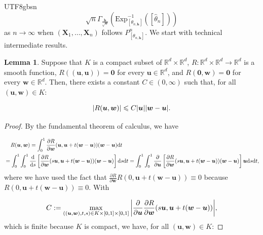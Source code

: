 \documentclass[12pt]{report}
\newcommand\tab[1][1cm]{\hspace*{#1}}
\newcommand{\bracket}[1]{\left ( #1 \right )}
\newcommand{\squared}[1]{\left [ #1 \right ]}
\theoremstyle{plain}
\theoremstyle{definition}
\newtheorem{lemma}[theorem]{Lemma}
\begin{document}
\begin{CJK*}{UTF8}{gbsn}
\begin{equation*}
  \sqrt{n} \Gamma_{\frac{\bm{h}}{\sqrt{n}}} \bracket{\text{Exp}^{-1}_{
    \squared{\theta_{n, \bm{h}}}}\bracket{\squared{\hat{\theta}_n}}}
\end{equation*}
as $n \to \infty$ when $(\bm{X}_1, \ldots, \bm{X}_n)$ 
follows $P^n_{\squared{\theta_{n,\bm{h}}}}$.
We start with technical intermediate results.

\begin{lemma}\label{thm:R_u_w_bound}
Suppose that $K$ is a compact subset of
$\mathbb{R}^d \times \mathbb{R}^d$,
$R: \mathbb{R}^d \times \mathbb{R}^d \to \mathbb{R}^d$ is a smooth function, 
$R((\bm{u}, \bm{u})) = \bm{0}$ for every $\bm{u} \in \mathbb{R}^d$,
and $R(\bm{0}, \bm{w}) = \bm{0}$ for every $\bm{w} \in \mathbb{R}^d$.
Then, there exists a constant $C \in (0, \infty)$ such that, 
for all $(\bm{u}, \bm{w})\in K$:

\begin{equation*}
  \abs{R(\bm{u}, \bm{w})} \leqslant C \abs{\bm{u}}\abs{\bm{w}-\bm{u}}.
\end{equation*}
\end{lemma}

\begin{proof}
By the fundamental theorem of calculus, we have

\begin{equation*}
  \begin{split}
  & \tab[0.4cm] R(\bm{u}, \bm{w}) = 
  \int_0^1 \frac{\partial R}{\partial \bm{w}}(\bm{u}, \bm{u} + t(\bm{w}-\bm{u}))(\bm{w}-\bm{u}) \mathrm{d} t
  \\ & = \int_0^1 \int_0^1 \frac{\mathrm{d}}{\mathrm{d}s}
  \squared{\frac{\partial R}{\partial \bm{w}}(s\bm{u}, \bm{u} + t(\bm{w}-\bm{u}))(\bm{w}-\bm{u})} \mathrm{d} s \mathrm{d} t
  = \int_0^1 \int_0^1 \frac{\partial }{\partial \bm{u}} \squared{\frac{\partial R}{\partial \bm{w}}
  (s\bm{u}, \bm{u} + t(\bm{w}-\bm{u}))(\bm{w}-\bm{u})}\bm{u}  \mathrm{d} s \mathrm{d} t,
  \end{split}
\end{equation*}
where we have used the fact that $\frac{\partial R}{\partial \bm{w}} R (0, \bm{u} + t(\bm{w}-\bm{u})) \equiv 0$
because $R (0, \bm{u} + t(\bm{w}-\bm{u})) \equiv 0$.
With 

\begin{equation*}
  C := \max_{((\bm{u}, \bm{w}),t,s) \in K \times [0,1] \times [0,1] } 
  \abs{\frac{\partial }{\partial \bm{u}} \frac{\partial R}{\partial \bm{w}}
  (s\bm{u}, \bm{u}+t(\bm{w}-\bm{u}))},
\end{equation*}
which is finite because $K$ is compact,
we have, for all $(\bm{u}, \bm{w})\in K$:


\end{proof}
\end{CJK*}
\end{document}

